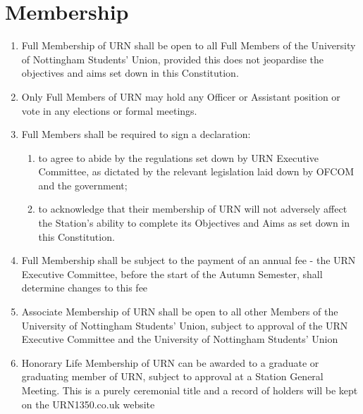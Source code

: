 \section{Membership}

\begin{enumerate}[label*=\thesection.\arabic*.]
    \item Full Membership of URN shall be open to all Full Members of the University of Nottingham Students' Union, provided this does not jeopardise the objectives and aims set down in this Constitution.
    \item Only Full Members of URN may hold any Officer or Assistant position or vote in any elections or formal meetings.
    \item \label{itm:revoke-membership}  Full Members shall be required to sign a declaration:
          \begin{enumerate}[label*=\arabic*.]
              \item to agree to abide by the regulations set down by URN Executive Committee, as dictated by the relevant legislation laid down by OFCOM and the government;
              \item to acknowledge that their membership of URN will not adversely affect the Station's ability to complete its Objectives and Aims as set down in this Constitution.
          \end{enumerate}
    \item Full Membership shall be subject to the payment of an annual fee - the URN Executive Committee, before the start of the Autumn Semester, shall determine changes to this fee
    \item Associate Membership of URN shall be open to all other Members of the University of Nottingham Students' Union, subject to approval of the URN Executive Committee and the University of Nottingham Students' Union
    \item Honorary Life Membership of URN can be awarded to a graduate or graduating member of URN, subject to approval at a Station General Meeting. This is a purely ceremonial title and a record of holders will be kept on the URN1350.co.uk website
\end{enumerate}
